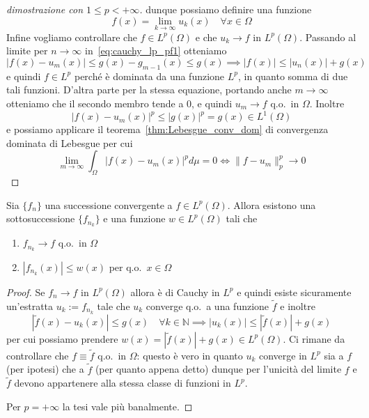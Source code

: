 \begin{proof}[dimostrazione con \(1 \le p < +\infty\)]
dunque possiamo definire una funzione
\[
    f(x) = \lim_{k\to \infty} u_{k}{(x)} \quad \forall x \in \Omega 
\]
Infine vogliamo controllare che \(f \in L^{p}{(\Omega)}\) e che \(u_k \to f\) in
\(L^{p}{(\Omega)}\). Passando al limite per \(n\to \infty\)
in~\eqref{eq:cauchy_lp_pf1} otteniamo
\[
    |f(x) - u_{m}{(x)}| \le g(x) - g_{m-1}{(x)} \le g(x)
    \implies 
    |f(x)| \le |u_{n}{(x)}| + g{(x)} 
\]
e quindi \(f \in L^{p}\) perché è dominata da una funzione \(L^{p}\), in quanto
somma di due tali funzioni. D'altra parte per la stessa equazione, portando
anche \(m\to \infty\) otteniamo che il secondo membro tende a 0, e quindi
\(u_{m}\to f\) q.o.~in \(\Omega\). Inoltre
\[
    \left| f(x) - u_{m}{(x)} \right|^{p} \le \left| g{(x)} \right|^{p} = g{(x)}
    \in L^{1}{(\Omega)}
\]
e possiamo applicare il teorema~\ref{thm:Lebesgue_conv_dom} di convergenza
dominata di Lebesgue per cui
\[
    \lim_{m\to \infty} \int_{\Omega} \left| f(x) - u_{m}(x) \right|^{p} d\mu = 0
    \iff \|f-u_{m}\|_p^{p} \longrightarrow 0
\]
\end{proof}
\begin{corollary}\label{cor:conv_lp_sottosucc}
    Sia \(\{f_{n}\} \) una successione convergente a \(f \in L^{p}{(\Omega)}\).
    Allora esistono una sottosuccessione \(\{f_{n_k}\} \) e una funzione \(w \in
    L^{p}{(\Omega)}\) tali che 
\begin{enumerate}[label = \arabic*.]
    \item \(f_{n_k} \to f\) q.o.~in \(\Omega\)
    \item \(\left| f_{n_k} {(x)} \right| \le w{(x)} \) per q.o.~\(x \in \Omega\)
\end{enumerate}
\end{corollary}
\begin{proof}
    Se \(f_{n}\to f\) in \(L^{p}{(\Omega)}\) allora è di Cauchy in \(L^{p}\) e
    quindi esiste sicuramente un'estratta \(u_k := f_{n_k} \) tale che \(u_k\)
    converge q.o.~a una funzione \(\tilde{f}\) e inoltre
\[
    \left| \tilde{f}{(x)} - u_k{(x)} \right| \le g(x) \quad \forall k \in
    \mathbb{N} \implies 
    \left| u_k{(x)} \right| \le \left| \tilde{f}{(x)} \right| +g{(x)}
\]
per cui possiamo prendere \(w{(x)} = \left| \tilde{f}{(x)} \right| + g{(x)} \in
L^{p}{(\Omega)}\). Ci rimane da controllare che \(f \equiv \tilde{f}\) q.o.~in
$\Omega$: questo è vero in quanto \(u_k\) converge in \(L^{p}\) sia a \(f\) (per
ipotesi) che a \(\tilde{f}\) (per quanto appena detto) dunque per l'unicità del
limite \(f \) e \(\tilde{f}\) devono appartenere alla stessa classe di funzioni
in \(L^{p}\).

Per \(p=+\infty\) la tesi vale più banalmente.
\end{proof}

